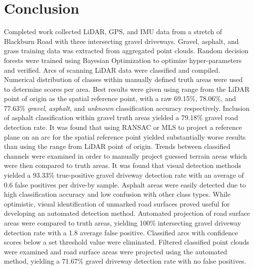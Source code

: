 \documentclass[numbered,pdftex]{ohio-etd}
\begin{document}
\chapter{Conclusion}{
	
	
	{Completed work collected LiDAR, GPS, and IMU data from a stretch of Blackburn Road with three intersecting gravel driveways. Gravel, asphalt, and grass training data was extracted from aggregated point clouds. Random decision forests were trained using Bayesian Optimization to optimize hyper-parameters and verified. Arcs of scanning LiDAR data were classified and compiled. Numerical distribution of classes within manually defined truth areas were used to determine scores per area. Best results were given using range from the LiDAR point of origin as the spatial reference point, with a raw 69.15\%, 78.06\%, and 77.63\% \textit{gravel}, \textit{asphalt}, and \textit{unknown} classification accuracy respectively. Inclusion of asphalt classification within gravel truth areas yielded a 79.18\% gravel road detection rate. It was found that using RANSAC or MLS to project a reference plane on an arc for the spatial reference point yielded substantially worse results than using the range from LiDAR point of origin. Trends between classified channels were examined in order to manually project guessed terrain areas which were then compared to truth areas. It was found that visual detection methods yielded a 93.33\% true-positive gravel driveway detection rate with an average of 0.6 false positives per drive-by sample. Asphalt areas were easily detected due to high classification accuracy and low confusion with other class types. While optimistic, visual identification of unmarked road surfaces proved useful for developing an automated detection method. Automated projection of road surface areas were compared to truth areas, yielding 100\% intersecting gravel driveway detection rate with a 1.8 average false positive. Classified arcs with confidence scores below a set threshold value were eliminated. Filtered classified point clouds were examined and road surface areas were projected using the automated method, yielding a 71.67\% gravel driveway detection rate with no false positives.}
	
}
\end{document}
